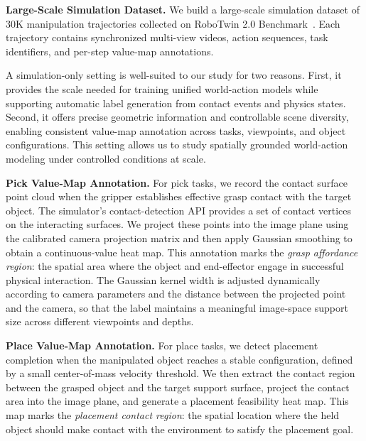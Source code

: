 
\label{sec:dataset}

\noindent\textbf{Large-Scale Simulation Dataset.}
We build a large-scale simulation dataset of 30K manipulation trajectories collected on RoboTwin 2.0 Benchmark~\cite{robotwin2.0}. Each trajectory contains synchronized multi-view videos, action sequences, task identifiers, and per-step value-map annotations.

A simulation-only setting is well-suited to our study for two reasons. First, it provides the scale needed for training unified world-action models while supporting automatic label generation from contact events and physics states. Second, it offers precise geometric information and controllable scene diversity, enabling consistent value-map annotation across tasks, viewpoints, and object configurations. This setting allows us to study spatially grounded world-action modeling under controlled conditions at scale.

\noindent\textbf{Pick Value-Map Annotation.}
For pick tasks, we record the contact surface point cloud when the gripper establishes effective grasp contact with the target object. The simulator's contact-detection API provides a set of contact vertices on the interacting surfaces. We project these points into the image plane using the calibrated camera projection matrix and then apply Gaussian smoothing to obtain a continuous-value heat map. This annotation marks the \emph{grasp affordance region}: the spatial area where the object and end-effector engage in successful physical interaction. The Gaussian kernel width is adjusted dynamically according to camera parameters and the distance between the projected point and the camera, so that the label maintains a meaningful image-space support size across different viewpoints and depths.

\noindent\textbf{Place Value-Map Annotation.}
For place tasks, we detect placement completion when the manipulated object reaches a stable configuration, defined by a small center-of-mass velocity threshold. We then extract the contact region between the grasped object and the target support surface, project the contact area into the image plane, and generate a placement feasibility heat map. This map marks the \emph{placement contact region}: the spatial location where the held object should make contact with the environment to satisfy the placement goal.

